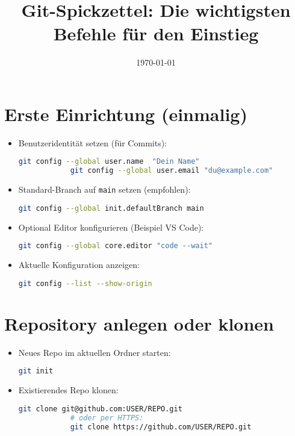 \documentclass[a4paper,11pt]{article}
\title{Git-Spickzettel: Die wichtigsten Befehle f\"ur den Einstieg}
\author{}
\date{\today}
\begin{document}
	\maketitle
	\small
	\tableofcontents
	\bigskip
	
	\section{Erste Einrichtung (einmalig)}
	\begin{itemize}
		\item Benutzeridentit\"at setzen (f\"ur Commits):
		\begin{lstlisting}[language=bash]
			git config --global user.name  "Dein Name"
			git config --global user.email "du@example.com"
		\end{lstlisting}
		\item Standard-Branch auf \texttt{main} setzen (empfohlen):
		\begin{lstlisting}[language=bash]
			git config --global init.defaultBranch main
		\end{lstlisting}
		\item Optional Editor konfigurieren (Beispiel VS Code):
		\begin{lstlisting}[language=bash]
			git config --global core.editor "code --wait"
		\end{lstlisting}
		\item Aktuelle Konfiguration anzeigen:
		\begin{lstlisting}[language=bash]
			git config --list --show-origin
		\end{lstlisting}
	\end{itemize}
	
	\section{Repository anlegen oder klonen}
	\begin{itemize}
		\item Neues Repo im aktuellen Ordner starten:
		\begin{lstlisting}[language=bash]
			git init
		\end{lstlisting}
		\item Existierendes Repo klonen:
		\begin{lstlisting}[language=bash]
			git clone git@github.com:USER/REPO.git
			# oder per HTTPS:
			git clone https://github.com/USER/REPO.git
		\end{lstlisting}
	\end{itemize}
	
\end{document}
